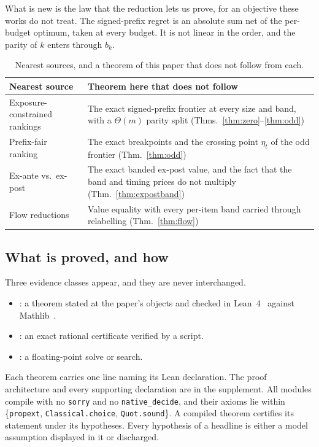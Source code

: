What is new is the law that the reduction lets us prove, for an objective these works do not
treat. The signed-prefix regret is an absolute sum net of the per-budget optimum, taken at
every budget. It is not linear in the order, and the parity of $k$ enters through $b_{k}$.

\begin{table}[h]
\caption{Nearest sources, and a theorem of this paper that does not follow from each.}
\label{tab:prior}
\centering
\footnotesize
\begin{tabular}{@{}p{}p{}@{}}
\toprule
Nearest source & Theorem here that does not follow \\
\midrule
Exposure-constrained rankings~\cite{singh2018} & The exact signed-prefix frontier at every
size and band, with a $\Theta(m)$ parity split (Thms.~\ref{thm:zero}--\ref{thm:odd}) \\
Prefix-fair ranking~\cite{celis2018} & The exact breakpoints and the crossing point
$\eta_{t}$ of the odd frontier (Thm.~\ref{thm:odd}) \\
Ex-ante vs.\ ex-post~\cite{singh2021,freeman2020} & The exact banded ex-post value, and the
fact that the band and timing prices do not multiply (Thm.~\ref{thm:expostband}) \\
Flow reductions~\cite{schrijver2003} & Value equality with every per-item band carried
through relabelling (Thm.~\ref{thm:flow}) \\
\bottomrule
\end{tabular}
\end{table}

\subsection{What is proved, and how}

Three evidence classes appear, and they are never interchanged.
\begin{itemize}
\item \PROVED: a theorem stated at the paper's objects and checked in
Lean~4~\cite{demoura2021} against Mathlib~\cite{mathlib2020}.
\item \CERT: an exact rational certificate verified by a script.
\item \NUM: a floating-point solve or search.
\end{itemize}
Each theorem carries one line naming its Lean declaration. The proof architecture and every
supporting declaration are in the supplement. All modules compile with no \texttt{sorry} and
no \texttt{native\_decide}, and their axioms lie within \{\texttt{propext},
\texttt{Classical.choice}, \texttt{Quot.sound}\}. A compiled theorem certifies its statement
under its hypotheses. Every hypothesis of a headline is either a model assumption displayed
in it or discharged.

